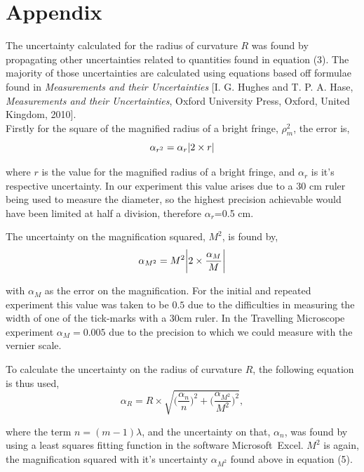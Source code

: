 \documentclass[twocolumn]{revtex4}
\begin{document}
\vfill
\twocolumngrid
\vspace{-3ex}
\section*{Appendix}
\vspace{-2ex}

The uncertainty calculated for the radius of curvature $R$ was found by propagating other uncertainties related to quantities found in equation (3). The majority of those uncertainties are calculated using equations based off formulae found in \textit{Measurements and their Uncertainties} [I. G. Hughes and T. P. A. Hase, \textit{Measurements and their Uncertainties}, Oxford University Press, Oxford, United Kingdom, 2010]. 
\\

Firstly for the square of the magnified radius of a bright fringe, $\rho_m^2$, the error is, 
\begin{equation} 
\alpha_{r^2}=\alpha_r\abs{2\times r}
\end{equation}

where $r$ is the value for the magnified radius of a bright fringe, and $\alpha_r$ is it's respective uncertainty. In our experiment this value arises due to a 30 cm ruler being used to measure the diameter, so the highest precision achievable would have been limited at half a division, therefore $\alpha_r$=0.5 cm. 

The uncertainty on the magnification squared, $M^2$, is found by,
\begin{equation} 
\alpha_{M^2}=M^2\abs{2\times\frac{\alpha_M}{M}}
\end{equation}

with $\alpha_{M}$ as the error on the magnification. For the initial and repeated experiment this value was taken to be $0.5$ due to the difficulties in measuring the width of one of the tick-marks with a $30$cm ruler. In the Travelling Microscope experiment $\alpha_{M}=0.005$ due to the precision to which we could measure with the vernier scale.    

To calculate the uncertainty on the radius of curvature $R$, the following equation is thus used,
\begin{equation} 
\alpha_R=R\times\sqrt{\Big(\frac{\alpha_n}{n}\Big)^2 + \Big(\frac{\alpha_{M^2}}{M^2}\Big)^2 },
\end{equation}

where the term $n=(m-1)\lambda$, and the uncertainty on that, $\alpha_n$, was found by using a least squares fitting function in the software Microsoft\textregistered \ Excel. $M^2$ is again, the magnification squared with it's uncertainty $\alpha_{M^2}$ found above in equation (5).  
\end{document}
